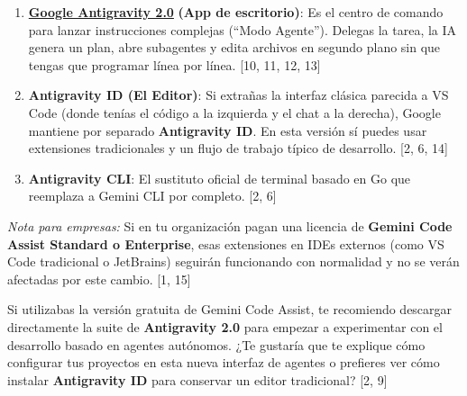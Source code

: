 \documentclass[12pt, a4paper]{article}
\begin{document}
\begin{enumerate}
    \item \href{https://antigravity.google/}{\textbf{Google Antigravity 2.0}} \textbf{(App de escritorio)}: Es el centro de comando para lanzar instrucciones complejas (``Modo Agente''). Delegas la tarea, la IA genera un plan, abre subagentes y edita archivos en segundo plano sin que tengas que programar línea por línea. [10, 11, 12, 13]
    \item \textbf{Antigravity ID (El Editor)}: Si extrañas la interfaz clásica parecida a VS Code (donde tenías el código a la izquierda y el chat a la derecha), Google mantiene por separado \textbf{Antigravity ID}. En esta versión sí puedes usar extensiones tradicionales y un flujo de trabajo típico de desarrollo. [2, 6, 14]
    \item \textbf{Antigravity CLI}: El sustituto oficial de terminal basado en Go que reemplaza a Gemini CLI por completo. [2, 6]
\end{enumerate}

\textit{Nota para empresas:} Si en tu organización pagan una licencia de \textbf{Gemini Code Assist Standard o Enterprise}, esas extensiones en IDEs externos (como VS Code tradicional o JetBrains) seguirán funcionando con normalidad y no se verán afectadas por este cambio. [1, 15]

Si utilizabas la versión gratuita de Gemini Code Assist, te recomiendo descargar directamente la suite de \textbf{Antigravity 2.0} para empezar a experimentar con el desarrollo basado en agentes autónomos. ¿Te gustaría que te explique cómo configurar tus proyectos en esta nueva interfaz de agentes o prefieres ver cómo instalar \textbf{Antigravity ID} para conservar un editor tradicional? [2, 9]
\end{document}

